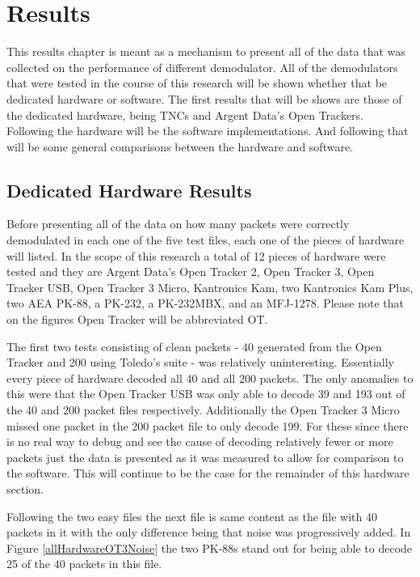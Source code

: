 \chapter{Results}
This results chapter is meant as a mechanism to present all of the data that was collected on the performance of different demodulator. All of the demodulators that were tested in the course of this research will be shown whether that be dedicated hardware or software. The first results that will be shows are those of the dedicated hardware, being TNCs and Argent Data's Open Trackers. Following the hardware will be the software implementations. And following that will be some general comparisons between the hardware and software.

\section{Dedicated Hardware Results}
Before presenting all of the data on how many packets were correctly demodulated in each one of the five test files, each one of the pieces of hardware will listed.  In the scope of this research a total of 12 pieces of hardware were tested and they are Argent Data's Open Tracker 2, Open Tracker 3, Open Tracker USB, Open Tracker 3 Micro, Kantronics Kam, two Kantronics Kam Plus, two AEA PK-88, a PK-232, a PK-232MBX, and an MFJ-1278. Please note that on the figures Open Tracker will be abbreviated OT.

The first two tests consisting of clean packets - 40 generated from the Open Tracker and 200 using Toledo's suite - was relatively uninteresting. Essentially every piece of hardware decoded all 40 and all 200 packets. The only anomalies to this were that the Open Tracker USB was only able to decode 39 and 193 out of the 40 and 200 packet files respectively. Additionally the Open Tracker 3 Micro missed one packet in the 200 packet file to only decode 199. For these since there is no real way to debug and see the cause of decoding relatively fewer or more packets just the data is presented as it was measured to allow for comparison to the software. This will continue to be the case for the remainder of this hardware section.

Following the two easy files the next file is same content as the file with 40 packets in it with the only difference being that noise was progressively added. In Figure \ref{allHardwareOT3Noise} the two PK-88s stand out for being able to decode 25 of the 40 packets in this file.


